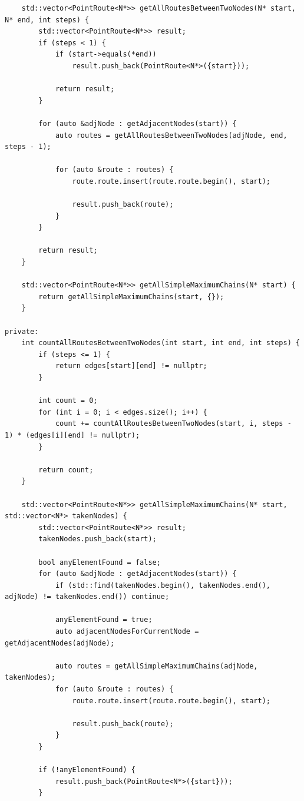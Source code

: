 \documentclass[a4paper,14pt]{extarticle}
\begin{document}
\begin{enumerate}[1.]
\begin{verbatim}
    std::vector<PointRoute<N*>> getAllRoutesBetweenTwoNodes(N* start, N* end, int steps) {
        std::vector<PointRoute<N*>> result;
        if (steps < 1) {
            if (start->equals(*end))
                result.push_back(PointRoute<N*>({start}));
            
            return result;
        }

        for (auto &adjNode : getAdjacentNodes(start)) {
            auto routes = getAllRoutesBetweenTwoNodes(adjNode, end, steps - 1);
            
            for (auto &route : routes) {
                route.route.insert(route.route.begin(), start);

                result.push_back(route);
            }
        }

        return result;
    }

    std::vector<PointRoute<N*>> getAllSimpleMaximumChains(N* start) {
        return getAllSimpleMaximumChains(start, {});
    }

private:
    int countAllRoutesBetweenTwoNodes(int start, int end, int steps) {
        if (steps <= 1) {
            return edges[start][end] != nullptr;
        }

        int count = 0;
        for (int i = 0; i < edges.size(); i++) {
            count += countAllRoutesBetweenTwoNodes(start, i, steps - 1) * (edges[i][end] != nullptr);
        }

        return count;
    }

    std::vector<PointRoute<N*>> getAllSimpleMaximumChains(N* start, std::vector<N*> takenNodes) {
        std::vector<PointRoute<N*>> result;
        takenNodes.push_back(start);

        bool anyElementFound = false;
        for (auto &adjNode : getAdjacentNodes(start)) {
            if (std::find(takenNodes.begin(), takenNodes.end(), adjNode) != takenNodes.end()) continue;
 
            anyElementFound = true;
            auto adjacentNodesForCurrentNode = getAdjacentNodes(adjNode);
            
            auto routes = getAllSimpleMaximumChains(adjNode, takenNodes);
            for (auto &route : routes) {
                route.route.insert(route.route.begin(), start);

                result.push_back(route);
            }
        }

        if (!anyElementFound) {
            result.push_back(PointRoute<N*>({start}));
        }


\end{verbatim}
\end{enumerate}
\end{document}

